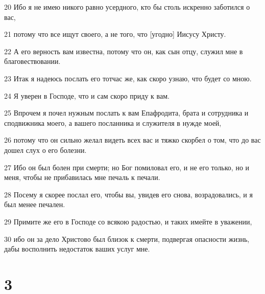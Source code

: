 \par 20 Ибо я не имею никого равно усердного, кто бы столь искренно заботился о вас,
\par 21 потому что все ищут своего, а не того, что [угодно] Иисусу Христу.
\par 22 А его верность вам известна, потому что он, как сын отцу, служил мне в благовествовании.
\par 23 Итак я надеюсь послать его тотчас же, как скоро узнаю, что будет со мною.
\par 24 Я уверен в Господе, что и сам скоро приду к вам.
\par 25 Впрочем я почел нужным послать к вам Епафродита, брата и сотрудника и сподвижника моего, а вашего посланника и служителя в нужде моей,
\par 26 потому что он сильно желал видеть всех вас и тяжко скорбел о том, что до вас дошел слух о его болезни.
\par 27 Ибо он был болен при смерти; но Бог помиловал его, и не его только, но и меня, чтобы не прибавилась мне печаль к печали.
\par 28 Посему я скорее послал его, чтобы вы, увидев его снова, возрадовались, и я был менее печален.
\par 29 Примите же его в Господе со всякою радостью, и таких имейте в уважении,
\par 30 ибо он за дело Христово был близок к смерти, подвергая опасности жизнь, дабы восполнить недостаток ваших услуг мне.

\chapter{3}

